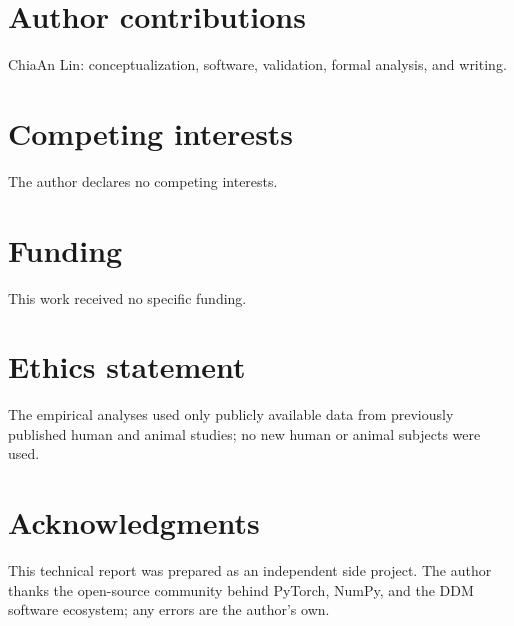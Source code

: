 \documentclass[11pt]{article}
\begin{document}
\section*{Author contributions}

ChiaAn Lin: conceptualization, software, validation, formal analysis, and writing.

\section*{Competing interests}

The author declares no competing interests.

\section*{Funding}

This work received no specific funding.

\section*{Ethics statement}

The empirical analyses used only publicly available data from previously published human and animal studies; no new human or animal subjects were used.

\section*{Acknowledgments}

This technical report was prepared as an independent side project. The author thanks the open-source community behind PyTorch, NumPy, and the DDM software ecosystem; any errors are the author's own.

{\footnotesize
\setlength{\bibsep}{0pt plus 0.2ex}


}
\end{document}
